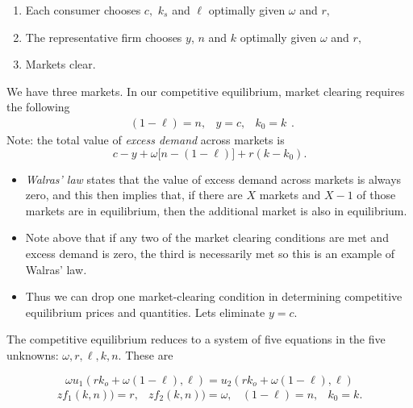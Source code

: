 \documentclass{sebase}
\begin{document}
\begin{enumerate}
\item Each consumer chooses $c,$ $k_{s}$ and $\ell $ optimally given $\omega 
$ and $r,$

\item The representative firm chooses $y$, $n$ and $k$ optimally given $%
\omega $ and $r,$

\item Markets clear.
\end{enumerate}

We have three markets. In our competitive equilibrium, market clearing
requires the following%
\begin{equation*}
\begin{array}{lll}
(1-\ell )=n, & y=c, & k_{0}=k%
\end{array}%
.
\end{equation*}%
Note: the total value of \textit{excess demand} across markets is%
\begin{equation*}
c-y+\omega \lbrack n-(1-\ell )]+r(k-k_{0}).
\end{equation*}

\pagebreak

\begin{itemize}
\item \textit{Walras' law} states that the value of excess demand across
markets is always zero, and this then implies that, if there are $X$ markets
and $X-1$ of those markets are in equilibrium, then the additional market is
also in equilibrium.

\item Note above that if any two of the market clearing conditions are met
and excess demand is zero, the third is necessarily met so this is an
example of Walras' law\textit{.}

\item Thus we can drop one market-clearing condition in determining
competitive equilibrium prices and quantities. Lets eliminate $y=c$.
\end{itemize}

\pagebreak

The competitive equilibrium reduces to a system of five equations in the
five unknowns: $\omega ,r,\ell ,k,n.$ These are

\begin{equation*}
\omega u_{1}(rk_{o}+\omega \left( 1-\ell \right) ,\ell )=u_{2}(rk_{o}+\omega
\left( 1-\ell \right) ,\ell )
\end{equation*}%
\begin{equation*}
\begin{array}{llll}
zf_{1}\left( k,n\right) )=r, & zf_{2}\left( k,n\right) )=\omega , & (1-\ell
)=n, & k_{0}=k.%
\end{array}%
\end{equation*}%
\newline
\end{document}
